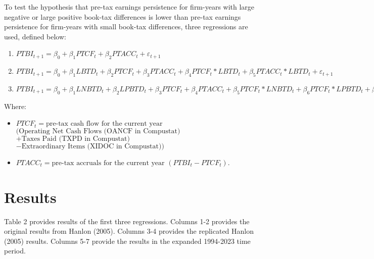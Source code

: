 \documentclass{article}
\begin{document}
To test the hypothesis that pre-tax earnings persistence for firm-years with large negative or large positive book-tax differences is lower than pre-tax earnings persistence for firm-years with small book-tax differences, three regressions are used, defined below:
\begin{enumerate}
    \item $PTBI_{t+1} = \beta_0 + \beta_1PTCF_t + \beta_2PTACC_t + \varepsilon_{t+1}$
    \item $PTBI_{t+1} = \beta_0 + \beta_1LBTD_t + \beta_2PTCF_t + \beta_3PTACC_t + \beta_4PTCF_t * LBTD_t + \beta_5PTACC_t * LBTD_t + \varepsilon_{t+1}$
    \item $PTBI_{t+1} = \beta_0 + \beta_1LNBTD_t + \beta_2LPBTD_t + \beta_3PTCF_t + \beta_4PTACC_t + \beta_5PTCF_t * LNBTD_t + \beta_6PTCF_t * LPBTD_t + \beta_7PTACC_t * LNBTD_t + \beta_8PTACC_t * LPBTD_t + \varepsilon_{t+1}$
\end{enumerate}
Where:
\begin{itemize}
   \item $PTCF_t = \text{pre-tax cash flow for the current year}$ \\
      $(\text{Operating Net Cash Flows (OANCF in Compustat)}$ \\
      $+ \text{Taxes Paid (TXPD in Compustat)}$ \\
      $- \text{Extraordinary Items (XIDOC in Compustat)})$

    \item $PTACC_t = \text{pre-tax accruals for the current year } (PTBI_t - PTCF_t)$.
\end{itemize}

\section{Results}
Table 2 provides results of the first three regressions. Columns 1-2 provides the original results from Hanlon (2005). Columns 3-4 provides the replicated Hanlon (2005) results. Columns 5-7 provide the results in the expanded 1994-2023 time period. 
\end{document}
